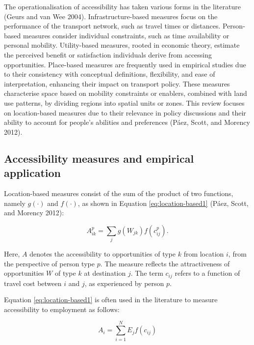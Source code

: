 \documentclass{article}
\begin{document}
The operationalisation of accessibility has taken various forms in the
literature (Geurs and van Wee 2004). Infrastructure-based measures focus
on the performance of the transport network, such as travel times or
distances. Person-based measures consider individual constraints, such
as time availability or personal mobility. Utility-based measures,
rooted in economic theory, estimate the perceived benefit or
satisfaction individuals derive from accessing opportunities.
Place-based measures are frequently used in empirical studies due to
their consistency with conceptual definitions, flexibility, and ease of
interpretation, enhancing their impact on transport policy. These
measures characterise space based on mobility constraints or enablers,
combined with land use patterns, by dividing regions into spatial units
or zones. This review focuses on location-based measures due to their
relevance in policy discussions and their ability to account for
people's abilities and preferences (Páez, Scott, and Morency 2012).

\subsection{Accessibility measures and empirical
application}\label{accessibility-measures-and-empirical-application}

Location-based measures consist of the sum of the product of two
functions, namely \(g(\cdot)\) and \(f(\cdot)\), as shown in Equation
\ref{eq:location-based1} (Páez, Scott, and Morency 2012):

\begin{equation}
   A^p_{ik} =  \sum_j g(W_{jk}) f(c^p_{ij}).
  \label{eq:location-based1}
\end{equation}

Here, \(A\) denotes the accessibility to opportunities of type \(k\)
from location \(i\), from the perspective of person type \(p\). The
measure reflects the attractiveness of opportunities \(W\) of type \(k\)
at destination \(j\). The term \(c_{ij}\) refers to a function of travel
cost between \(i\) and \(j\), as experienced by person \(p\).

Equation \ref{eq:location-based1} is often used in the literature to
measure accessibility to employment as follows:

\begin{equation}
  A_{i} = \sum^N_{i=1} E_j f(c_{ij})
  \label{eq:access-employment-general}
\end{equation}
\end{document}

